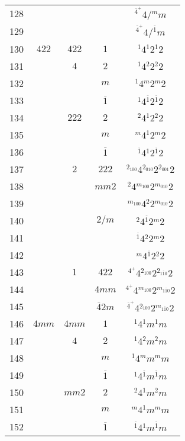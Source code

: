 \begin{longtable}{ccccc}
  128 &  &  &  & ${}^{\overline{4}^{+}} 4  / {}^{m} m $\\
  129 &  &  &  & ${}^{\overline{4}^{+}} 4  / {}^{\overline{1}} m $\\
  130 & $422$ & $422$ & $1$ & ${}^{1} 4 {}^{1} 2 {}^{1} 2 $\\
  131 &  & $4$ & $2$ & ${}^{1} 4 {}^{2} 2 {}^{2} 2 $\\
  132 &  &  & $m$ & ${}^{1} 4 {}^{m} 2 {}^{m} 2 $\\
  133 &  &  & $\overline{1}$ & ${}^{1} 4 {}^{\overline{1}} 2 {}^{\overline{1}} 2 $\\
  134 &  & $222$ & $2$ & ${}^{2} 4 {}^{1} 2 {}^{2} 2 $\\
  135 &  &  & $m$ & ${}^{m} 4 {}^{1} 2 {}^{m} 2 $\\
  136 &  &  & $\overline{1}$ & ${}^{\overline{1}} 4 {}^{1} 2 {}^{\overline{1}} 2 $\\
  137 &  & $2$ & $222$ & ${}^{2_{100}} 4 {}^{2_{010}} 2 {}^{2_{001}} 2 $\\
  138 &  &  & $mm2$ & ${}^{2} 4 {}^{m_{100}} 2 {}^{m_{010}} 2 $\\
  139 &  &  &  & ${}^{m_{100}} 4 {}^{2} 2 {}^{m_{010}} 2 $\\
  140 &  &  & $2/m$ & ${}^{2} 4 {}^{\overline{1}} 2 {}^{m} 2 $\\
  141 &  &  &  & ${}^{\overline{1}} 4 {}^{2} 2 {}^{m} 2 $\\
  142 &  &  &  & ${}^{m} 4 {}^{\overline{1}} 2 {}^{2} 2 $\\
  143 &  & $1$ & $422$ & ${}^{4^{+}} 4 {}^{2_{100}} 2 {}^{2_{1\overline{1}0}} 2 $\\
  144 &  &  & $4mm$ & ${}^{4^{+}} 4 {}^{m_{100}} 2 {}^{m_{1\overline{1}0}} 2 $\\
  145 &  &  & $\overline{4}2m$ & ${}^{\overline{4}^{+}} 4 {}^{2_{100}} 2 {}^{m_{1\overline{1}0}} 2 $\\
  146 & $4mm$ & $4mm$ & $1$ & ${}^{1} 4 {}^{1} m {}^{1} m $\\
  147 &  & $4$ & $2$ & ${}^{1} 4 {}^{2} m {}^{2} m $\\
  148 &  &  & $m$ & ${}^{1} 4 {}^{m} m {}^{m} m $\\
  149 &  &  & $\overline{1}$ & ${}^{1} 4 {}^{\overline{1}} m {}^{\overline{1}} m $\\
  150 &  & $mm2$ & $2$ & ${}^{2} 4 {}^{1} m {}^{2} m $\\
  151 &  &  & $m$ & ${}^{m} 4 {}^{1} m {}^{m} m $\\
  152 &  &  & $\overline{1}$ & ${}^{\overline{1}} 4 {}^{1} m {}^{\overline{1}} m $\\

\end{longtable}
